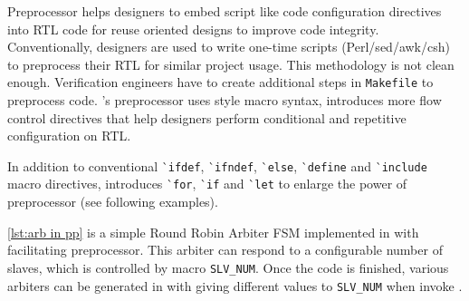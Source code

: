 Preprocessor helps designers to embed script like 
code configuration directives into RTL code for reuse 
oriented designs to improve code integrity. Conventionally, 
designers are used to write one-time scripts (Perl/sed/awk/csh)
to preprocess their RTL for similar project usage. This methodology
is not clean enough. Verification engineers have to create additional
steps in \texttt{Makefile} to preprocess code. 
\mhdl{}'s preprocessor uses \vlog{} style macro syntax, introduces 
more flow control directives that help designers perform conditional and 
repetitive configuration on RTL. 

In addition to conventional \`{}\texttt{ifdef}, \`{}\texttt{ifndef}, 
\`{}\texttt{else}, \`{}\texttt{define} and \`{}\texttt{include} 
macro directives, \mhdl{} introduces \`{}\texttt{for}, \`{}\texttt{if} and
\`{}\texttt{let} to enlarge the power of preprocessor (see following examples). 

\autoref{lst:arb in pp} is a simple Round Robin Arbiter FSM implemented 
in \mhdl{} with facilitating preprocessor. This arbiter can respond to 
a configurable number of slaves, which is controlled by macro \texttt{SLV\_NUM}. 
Once the \mhdl{} code is finished, various arbiters can be generated in \sv{} with 
giving different values to \texttt{SLV\_NUM} when invoke \mhdlc{}.

